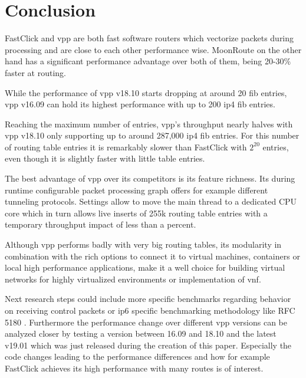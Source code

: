 \chapter{Conclusion}

FastClick and \Ac{vpp} are both fast software routers which vectorize
packets during processing and are close to each other performance
wise. MoonRoute on the other hand has a significant performance
advantage over both of them, being 20-30\% faster at routing.

While the performance of \Ac{vpp} v18.10 starts dropping at around 20
\Ac{fib} entries, \Ac{vpp} v16.09 can hold its highest performance
with up to 200 \Ac{ip4} \Ac{fib} entries. 

Reaching the maximum number of entries, \Ac{vpp}'s throughput nearly
halves with \Ac{vpp} v18.10 only supporting up to around 287,000
\Ac{ip4} \Ac{fib} entries. For this number of routing table entries it
is remarkably slower than FastClick with $2^{20}$ entries, even though
it is slightly faster with little table entries.

The best advantage of \Ac{vpp} over its competitors is its feature
richness. Its during runtime configurable packet processing graph
offers for example different tunneling protocols. Settings allow to
move the main thread to a dedicated CPU core which in turn allows live
inserts of 255k routing table entries with a temporary throughput
impact of less than a percent.

Although \Ac{vpp} performs badly with very big routing tables, its
modularity in combination with the rich options to connect it to
virtual machines, containers or local high performance applications,
make it a well choice for building virtual networks for highly
virtualized environments or implementation of \Ac{vnf}.

Next research steps could include more specific benchmarks regarding
behavior on receiving control packets or \Ac{ip6} specific
benchmarking methodology like RFC 5180 \cite{rfc5180}. Furthermore the
performance change over different \Ac{vpp} versions can be analyzed
closer by testing a version between 16.09 and 18.10 and the latest
v19.01 which was just released during the creation of this paper.
Especially the code changes leading to the performance differences and
how for example FastClick achieves its high performance with many
routes is of interest.



